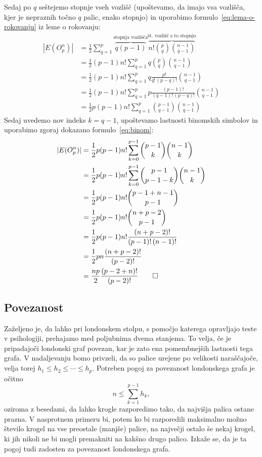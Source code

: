 \documentclass[twoside,11pt]{article}
\begin{document}
Sedaj po $q$ seštejemo stopnje vseh vozlišč (upoštevamo, da imajo vsa vozlišča, kjer je nepraznih točno $q$ palic, enako stopnjo) in uporabimo formulo~\eqref{eq:lema-o-rokovanju} iz leme o rokovanju:
\begin{align*}
|E(O^n_p)|
&= \frac{1}{2} \sum_{q=1}^{p} \overbrace{q(p-1)}^{\text{stopnja vozlišča}} 
\overbrace{n! {p \choose q} {n-1 \choose q-1} }^{\text{št.~vozlišč s to stopnjo}} \\
&= \frac{1}{2} (p-1) n! \sum_{q=1}^{p} q {p \choose q} {n-1 \choose q-1} \\
&= \frac{1}{2} (p-1) n! \sum_{q=1}^{p} q \frac{p!}{q! \, (p-q)!} {n-1 \choose q-1} \\
&= \frac{1}{2} (p-1) n! \sum_{q=1}^{p} p \frac{(p-1)!}{(q-1)! \, (p-q)!} {n-1 \choose q-1} \\
&= \frac{1}{2} p (p-1) n! \sum_{q=1}^{p} {p-1 \choose q-1} {n-1 \choose q-1}
\end{align*}
Sedaj uvedemo nov indeks $k = q-1$, upoštevamo lastnosti binomskih simbolov in uporabimo zgoraj dokazano formulo~\eqref{eq:binom}:
\begin{align*}
|E(O^n_p)|
&= \frac{1}{2} p (p-1) n! \sum_{k=0}^{p-1} {p-1 \choose k} {n-1 \choose k} \\
&= \frac{1}{2} p (p-1) n! \sum_{k=0}^{p-1} {p-1 \choose p-1-k} {n-1 \choose k} \\
&= \frac{1}{2} p (p-1) n! {p-1 + n-1 \choose p-1} \\
&= \frac{1}{2} p (p-1) n! {n + p - 2 \choose p-1} \\
&= \frac{1}{2} p (p-1) n! \frac{(n+p-2)!}{(p-1)!\,(n-1)!} \\
&= \frac{1}{2} p n \frac{(n+p-2)!}{(p-2)!} \\
&= \frac{np}{2} \frac{(p-2+n)!}{(p-2)!} \qedhere
\end{align*}
\endproof

\subsection{Povezanost}

Zaželjeno je, da lahko pri londonskem stolpu, s pomočjo katerega opravljajo teste v psihologiji, prehajamo med poljubnima dvema stanjema. To velja, če je pripadajoči londonski graf povezan, kar je zato ena pomembnejših lastnosti tega grafa.
V nadaljevanju bomo privzeli, da so palice urejene po velikosti naraščajoče, velja torej $h_1 \leq h_2 \leq \cdots \leq h_p$.
Potreben pogoj za povezanost londonskega grafa je očitno 
\[ n \leq \sum_{k=1}^{p-1} h_k, \]
oziroma z besedami, da lahko krogle razporedimo tako, da najvišja palica ostane prazna. V nasprotnem primeru bi, potem ko bi razporedili maksimalno možno število krogel na vse preostale (manjše) palice, na največji ostalo še nekaj krogel, ki jih nikoli ne bi mogli premakniti na kakšno drugo palico.
Izkaže se, da je ta pogoj tudi zadosten za povezanost londonskega grafa.
\end{document}
